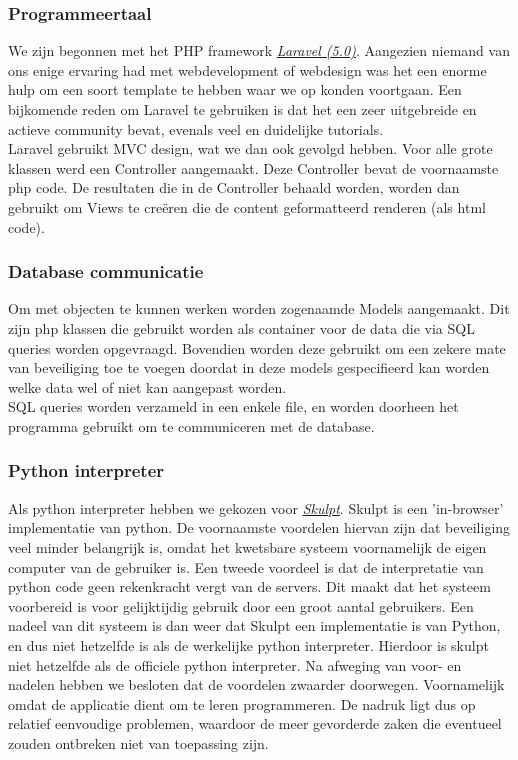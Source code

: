 \subsubsection{Programmeertaal}
We zijn begonnen met het PHP framework \href{http://laravel.com/}{\emph{Laravel (5.0)}}.
Aangezien niemand van ons enige ervaring had met webdevelopment of webdesign was het een
enorme hulp om een soort template te hebben waar we op konden voortgaan. Een bijkomende reden
om Laravel te gebruiken is dat het een zeer uitgebreide en actieve community bevat, evenals veel en
duidelijke tutorials. \\
Laravel gebruikt MVC design, wat we dan ook gevolgd hebben. Voor alle grote klassen
werd een Controller aangemaakt. Deze Controller bevat de voornaamste php code. De resultaten die in de
Controller behaald worden, worden dan gebruikt om Views te cre\"{e}ren die de content geformatteerd renderen (als html code).

\subsubsection{Database communicatie}
Om met objecten te kunnen werken worden zogenaamde Models aangemaakt. Dit zijn php klassen die
gebruikt worden als container voor de data die via SQL queries worden opgevraagd.
Bovendien worden deze gebruikt om een zekere mate van beveiliging toe te voegen doordat
in deze models gespecifieerd kan worden welke data wel of niet kan aangepast worden. \\
SQL queries worden verzameld in een enkele file, en worden doorheen het programma gebruikt om te communiceren
met de database.

\subsubsection{Python interpreter}
Als python interpreter hebben we gekozen voor \href{http://www.skulpt.org/}{\emph{Skulpt}}.
Skulpt is een 'in-browser' implementatie van python. De voornaamste voordelen hiervan zijn dat
beveiliging veel minder belangrijk is, omdat het kwetsbare systeem voornamelijk de eigen computer
van de gebruiker is. Een tweede voordeel is dat de interpretatie van python code geen rekenkracht vergt van
de servers. Dit maakt dat het systeem voorbereid is voor gelijktijdig gebruik door een groot aantal gebruikers.
Een nadeel van dit systeem is dan weer dat Skulpt een implementatie is van Python, en dus niet hetzelfde is als de
werkelijke python interpreter. Hierdoor is skulpt niet hetzelfde als de officiele python interpreter. Na
afweging van voor- en nadelen hebben we besloten dat de voordelen zwaarder doorwegen. Voornamelijk omdat
de applicatie dient om te leren programmeren. De nadruk ligt dus op relatief eenvoudige problemen, waardoor
de meer gevorderde zaken die eventueel zouden ontbreken niet van toepassing zijn.

